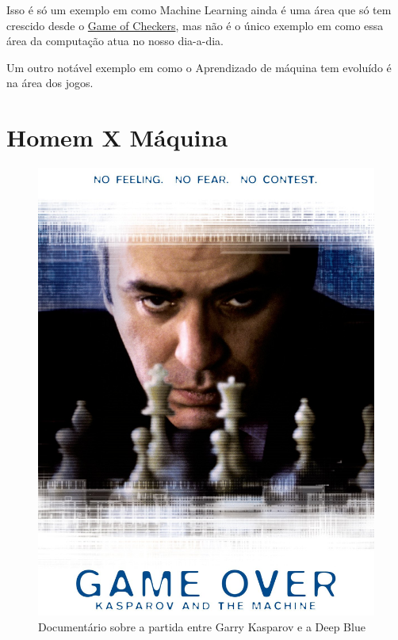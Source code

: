 \documentclass[12pt]{article}
\begin{document}
    Isso é só um exemplo em como Machine Learning ainda é uma área que só tem 
    crescido desde o \href{run:../Capitulo01.pdf}{Game of Checkers}, mas não é 
    o único exemplo em como essa área da computação atua no nosso dia-a-dia.

    Um outro notável exemplo em como o Aprendizado de máquina tem evoluído é
    na área dos jogos.

    \newpage
    \section{Homem X Máquina} \label{sec:deep_blue}

    \begin{figure}[htp]
        \centering
        \includegraphics[scale=0.2]{GameOver.jpg}
        \caption{\centering Documentário sobre a partida entre Garry Kasparov e a Deep Blue}
    \end{figure}
\end{document}
